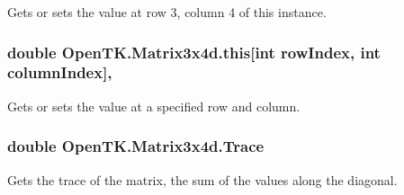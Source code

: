 Gets or sets the value at row 3, column 4 of this instance. 

\hypertarget{struct_open_t_k_1_1_matrix3x4d_a926102e638e42a814c67ad6e645d3db4}{
\subsubsection[{this[int row\-Index, int column\-Index]}]{\setlength{\rightskip}{0pt plus 5cm}double Open\-T\-K.\-Matrix3x4d.\-this\mbox{[}int row\-Index, int column\-Index\mbox{]}\hspace{0.3cm}{\ttfamily [get]}, {\ttfamily [set]}}}\label{struct_open_t_k_1_1_matrix3x4d_a926102e638e42a814c67ad6e645d3db4}


Gets or sets the value at a specified row and column. 

\hypertarget{struct_open_t_k_1_1_matrix3x4d_ac813f73e346f88905ea7c891ee7bad8f}{
\subsubsection[{Trace}]{\setlength{\rightskip}{0pt plus 5cm}double Open\-T\-K.\-Matrix3x4d.\-Trace\hspace{0.3cm}{\ttfamily [get]}}}\label{struct_open_t_k_1_1_matrix3x4d_ac813f73e346f88905ea7c891ee7bad8f}


Gets the trace of the matrix, the sum of the values along the diagonal. 

